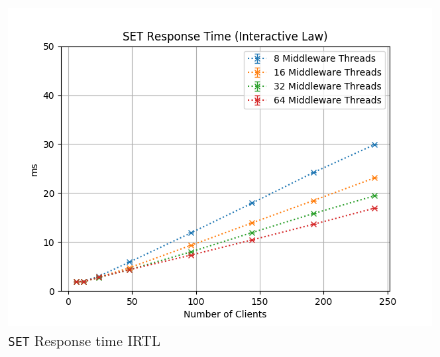 \documentclass[11pt,a4paper]{article}
\begin{document}
%
\begin{figure}[H]
	\centering
	\captionsetup{width=0.4\textwidth}
    \begin{minipage}{0.5\textwidth}
        \includegraphics[width=\textwidth]{../illustrations/plots/2_1_one_middleware/1-0/middleware_interactive_set_rt_ms.png}
        \caption{\texttt{SET} Response time IRTL}
        \label{fig:one_middleware_set_rt_it}
    \end{minipage}\hfill
\end{figure}
%
\end{document}
